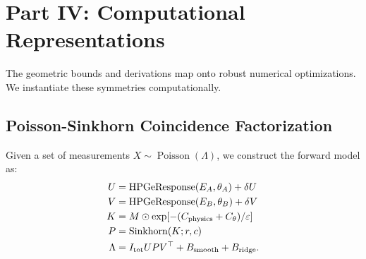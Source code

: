 \section{Part IV: Computational Representations}
\label{sec:part4}

The geometric bounds and derivations map onto robust numerical optimizations. We instantiate these symmetries computationally.

\subsection{Poisson-Sinkhorn Coincidence Factorization}

\begin{mdefinition}
Given a set of measurements $X \sim \operatorname{Poisson}(\Lambda)$, we construct the forward model as:
\begin{align}
U &= \text{HPGeResponse}(E_A,\theta_A) + \delta U \\
V &= \text{HPGeResponse}(E_B,\theta_B) + \delta V \\
K &= M \odot \exp[-(C_{\rm physics} + C_\theta)/\varepsilon] \\
P &= \operatorname{Sinkhorn}(K; r, c) \\
\Lambda &= I_{\rm tot} U P V^\top + B_{\rm smooth} + B_{\rm ridge}.
\end{align}
\end{mdefinition}

\begin{eresult}
\end{eresult}

\begin{phypothesis}
\end{phypothesis}

